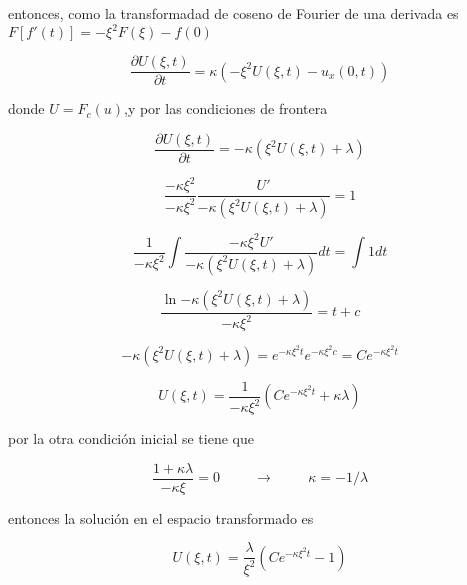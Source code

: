 \documentclass[12pt,a4paper]{article}
\begin{document}
\begin{enumerate}
    entonces, como la transformadad de coseno de Fourier de una derivada es $F[f'(t)]=-\xi^2F(\xi)-f(0)$
    
    \begin{equation*}
        \frac{\partial U(\xi,t)}{\partial t}=\kappa (-\xi^2 U(\xi,t)-u_x(0,t))
    \end{equation*}
    
    donde $U=F_c(u)$,y por las condiciones de frontera
    
    \begin{equation*}
        \frac{\partial U(\xi,t)}{\partial t}=-\kappa (\xi^2 U(\xi,t)+\lambda)
    \end{equation*}
    
    \begin{equation*}
        \frac{-\kappa \xi^2}{-\kappa \xi^2}\frac{U'}{-\kappa (\xi^2 U(\xi,t)+\lambda)}= 1
    \end{equation*}
    
    \begin{equation*}
        \frac{1}{-\kappa \xi^2}\int\frac{-\kappa \xi^2U'}{-\kappa (\xi^2 U(\xi,t)+\lambda)}dt=\int 1 dt
    \end{equation*}
    
    \begin{equation*}
        \frac{\ln{-\kappa (\xi^2 U(\xi,t)+\lambda)}}{-\kappa \xi^2}=t + c
    \end{equation*}
    
    \begin{equation*}
        -\kappa (\xi^2 U(\xi,t)+\lambda)=e^{-\kappa \xi^2t}  e^{-\kappa \xi^2c}=Ce^{-\kappa \xi^2t}
    \end{equation*}
    
    \begin{equation*}
        U(\xi,t)=\frac{1}{-\kappa \xi^2}(Ce^{-\kappa \xi^2t}+\kappa\lambda)
    \end{equation*}
    
    por la otra condición inicial se tiene que
    
    \begin{equation*}
        \frac{1+\kappa\lambda}{-\kappa\xi} = 0 \hspace{1cm} \rightarrow \hspace{1cm} \kappa=-1/\lambda
    \end{equation*}
    
    entonces la solución en el espacio transformado es
    
    \begin{equation*}
        U(\xi,t)=\frac{\lambda}{\xi^2}(Ce^{-\kappa \xi^2t}-1)
    \end{equation*}
    

\end{enumerate}
\end{document}

